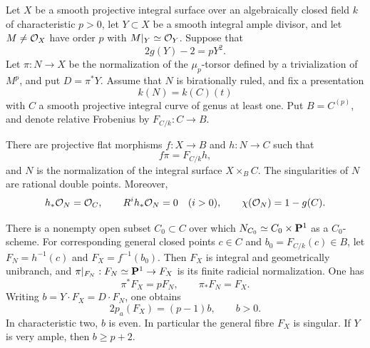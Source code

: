 \begin{proposition}\label{prop:positive-genus-picard-fibration}
Let $X$ be a smooth projective integral surface over an algebraically
closed field $k$ of characteristic $p>0$, let $Y\subset X$ be a smooth
integral ample divisor, and let $M\ne\mathcal O_X$ have order $p$ with
$M|_Y\simeq\mathcal O_Y$. Suppose that
\[
 2g(Y)-2=pY^2.
\]
Let $\pi:N\to X$ be the normalization of the $\mu_p$-torsor defined
by a trivialization of $M^p$, and put $D=\pi^*Y$.
Assume that $N$ is birationally ruled, and fix a presentation
\[
 k(N)=k(C)(t)
\]
with $C$ a smooth projective integral curve of genus at least one.
Put $B=C^{(p)}$, and denote relative Frobenius by
$F_{C/k}:C\to B$.

There are projective flat morphisms $f:X\to B$ and $h:N\to C$ such that
\[
 f\pi=F_{C/k}h,
\]
and $N$ is the normalization of the integral surface $X\times_B C$.
The singularities of $N$ are rational double points. Moreover,
\[
 h_*\mathcal O_N=\mathcal O_C,\qquad R^ih_*\mathcal O_N=0\quad(i>0),
 \qquad \chi(\mathcal O_N)=1-g(C).
\]

There is a nonempty open subset $C_0\subset C$ over which
$N_{C_0}\simeq C_0\times\mathbf P^1$ as a $C_0$-scheme.
For corresponding general closed points
$c\in C$ and $b_0=F_{C/k}(c)\in B$, let
$F_N=h^{-1}(c)$ and $F_X=f^{-1}(b_0)$. Then $F_X$ is integral and
geometrically unibranch, and
$\pi|_{F_N}:F_N\simeq\mathbf P^1\to F_X$ is its finite radicial
normalization. One has
\[
 \pi^*F_X=pF_N,\qquad \pi_*F_N=F_X.
\]
Writing $b=Y\cdot F_X=D\cdot F_N$, one obtains
\[
 2p_a(F_X)=(p-1)b,\qquad b>0.
\]
In characteristic two, $b$ is even. In particular the general fibre
$F_X$ is singular. If $Y$ is very ample, then $b\geq p+2$.
\end{proposition}

